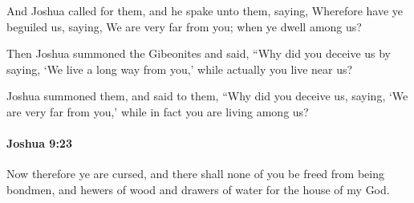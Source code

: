 			\begin{versebox}
					\item[BHS] 
					\item[ASV] And Joshua called for them, and he spake unto them, saying, Wherefore have ye beguiled us, saying, We are very far from you; when ye dwell among us?
					\item[NIV] Then Joshua summoned the Gibeonites and said, “Why did you deceive us by saying, ‘We live a long way from you,’ while actually you live near us?
					\item[NRSV] Joshua summoned them, and said to them, “Why did you deceive us, saying, ‘We are very far from you,’ while in fact you are living among us?
			\end{versebox}

		\paragraph{Joshua 9:23} %
			\label{JOSHUA-9-23}

			Now therefore ye are cursed, and there shall none of you be freed from being bondmen, and hewers of wood and drawers of water for the house of my God.

